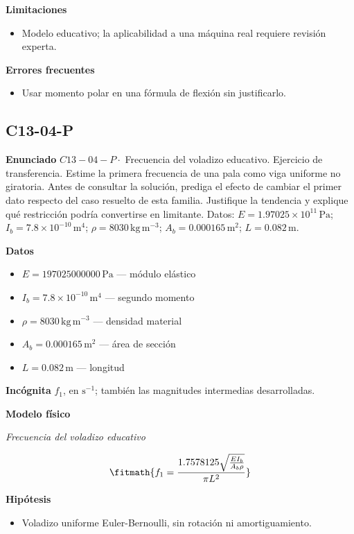 \documentclass[10pt,openany]{book}
\begin{document}
\noindent\textbf{Limitaciones}
\begin{itemize}
\item Modelo educativo; la aplicabilidad a una máquina real requiere revisión experta.
\end{itemize}

\noindent\textbf{Errores frecuentes}
\begin{itemize}
\item Usar momento polar en una fórmula de flexión sin justificarlo.
\end{itemize}
\subsection*{C13-04-P}

\noindent\textbf{Enunciado}
\(C13-04-P \cdot\) Frecuencia del voladizo educativo. Ejercicio de transferencia. Estime la primera frecuencia de una pala como viga uniforme no giratoria. Antes de consultar la solución, prediga el efecto de cambiar el primer dato respecto del caso resuelto de esta familia. Justifique la tendencia y explique qué restricción podría convertirse en limitante. Datos: \(E=1.97025\times 10^{11}\, \mathrm{Pa}\); \(I_b=7.8\times 10^{-10}\, \mathrm{m}^{4}\); \(\rho=8030\, \mathrm{kg}\,\mathrm{m}^{-3}\); \(A_b=0.000165\, \mathrm{m}^{2}\); \(L=0.082\, \mathrm{m}\).

\noindent\textbf{Datos}
\begin{itemize}
\item $E = 197025000000\,\mathrm{Pa}$ — módulo elástico
\item $I_b = 7.8\times 10^{-10}\,\mathrm{m}^{4}$ — segundo momento
\item $\rho = 8030\,\mathrm{kg}\,\mathrm{m}^{-3}$ — densidad material
\item $A_b = 0.000165\,\mathrm{m}^{2}$ — área de sección
\item $L = 0.082\,\mathrm{m}$ — longitud
\end{itemize}

\noindent\textbf{Incógnita}
$f_1$, en $\mathrm{s^{-1}}$; también las magnitudes intermedias desarrolladas.

\noindent\textbf{Modelo físico}

\noindent\textit{Frecuencia del voladizo educativo}

\[
\fitmath{f_1=\frac{1.7578125 \sqrt{\frac{E I_b}{A_b \rho}}}{\pi L^{2}}}
\]

\noindent\textbf{Hipótesis}
\begin{itemize}
\item Voladizo uniforme Euler-Bernoulli, sin rotación ni amortiguamiento.
\end{itemize}
\end{document}
